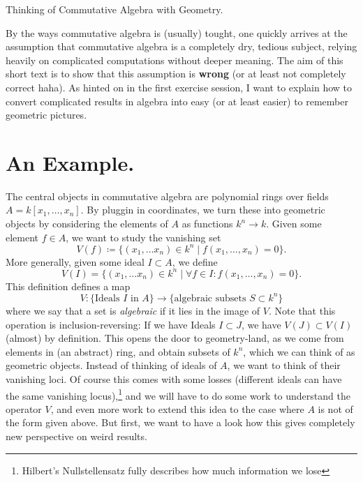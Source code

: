 \documentclass[a4paper,11pt]{article}
\begin{document}
\begin{center}
    \huge{Thinking of Commutative Algebra with Geometry.}
\end{center}


By the ways commutative algebra is (usually) tought, one quickly arrives at the
assumption that commutative algebra is a completely dry, tedious subject, relying
heavily on complicated computations without deeper meaning. The aim of this short
text is to show that this assumption is \textbf{wrong} (or at least not completely
correct haha). As hinted on in the first exercise session, I want to explain
how to convert complicated results in algebra into easy (or at least easier) to 
remember geometric pictures. 

\section{An Example.}
The central objects in commutative algebra are polynomial rings over fields $A =
k[x_1, \dots, x_n]$. By pluggin in coordinates, we turn these into geometric
objects by considering the elements of $A$ as
functions $k^n \to k$. Given some element $f \in A$, we want to study the vanishing
set 
\begin{equation*}
    V(f) \coloneqq \{(x_1, \dots x_n) \in k^n \mid f(x_1, \dots, x_n) = 0\}.
\end{equation*}
More generally, given some ideal $I \subset A$, we define 
\begin{equation*}
    V(I) = \{(x_1, \dots x_n) \in k^n \mid \forall f \in I : f(x_1, \dots, x_n) = 0 \}.
\end{equation*}
This definition defines a map
\begin{equation*}
    V: \{\text{Ideals $I$ in $A$}\} \to \{\text{algebraic subsets }S \subset k^n\}
\end{equation*}
where we say that a set is \textit{algebraic} if it lies in the image of $V$. 
Note that this operation is inclusion-reversing: If we have Ideals $I \subset J$, 
we have $V(J) \subset V(I)$ (almost) by definition. This opens the door to 
geometry-land, as we come from elements in (an abstract) ring, and obtain 
subsets of $k^n$, which we can think of as geometric objects. Instead 
of thinking of ideals of $A$, we want to think of their vanishing loci. 
Of course this comes with some losses (different ideals can have the same vanishing
locus),\footnote{Hilbert's Nullstellensatz fully describes how much information
we lose} and we will have to do some work to understand the operator $V$,
and even more work to extend this idea to the case where $A$ is not of the form
given above. But first, we want to have a look how this gives completely new
perspective on weird results.
\end{document}
